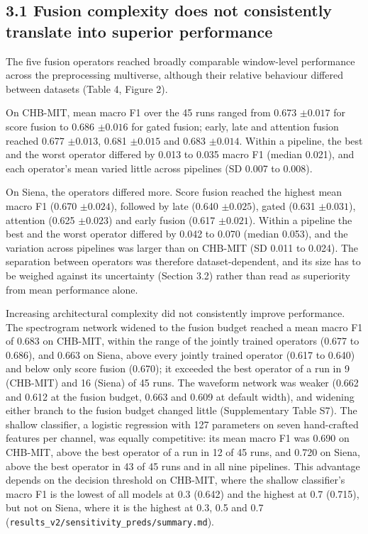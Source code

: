 \documentclass[11pt,a4paper]{article}
\begin{document}
\subsection{3.1 Fusion complexity does not consistently translate into superior performance}\label{fusion-complexity-does-not-consistently-translate-into-superior-performance}

The five fusion operators reached broadly comparable window-level performance across
the preprocessing multiverse, although their relative behaviour differed between
datasets (Table 4, Figure 2).

On CHB-MIT, mean macro F1 over the 45 runs ranged from 0.673 \(\pm 0.017\) for score fusion to
0.686 \(\pm 0.016\) for gated fusion; early, late and attention fusion reached 0.677 \(\pm 0.013\),
0.681 \(\pm 0.015\) and 0.683 \(\pm 0.014.\) Within a pipeline, the best and the worst operator
differed by 0.013 to 0.035 macro F1 (median 0.021), and each operator's mean varied
little across pipelines (SD 0.007 to 0.008).

On Siena, the operators differed more. Score fusion reached the highest mean macro F1
(0.670 \(\pm 0.024\)), followed by late (0.640 \(\pm 0.025\)), gated (0.631 \(\pm 0.031\)), attention
(0.625 \(\pm 0.023\)) and early fusion (0.617 \(\pm 0.021\)). Within a pipeline the best and the worst
operator differed by 0.042 to 0.070 (median 0.053), and the variation across pipelines
was larger than on CHB-MIT (SD 0.011 to 0.024). The separation between operators was
therefore dataset-dependent, and its size has to be weighed against its uncertainty
(Section 3.2) rather than read as superiority from mean performance alone.

Increasing architectural complexity did not consistently improve performance. The
spectrogram network widened to the fusion budget reached a mean macro F1 of 0.683 on
CHB-MIT, within the range of the jointly trained operators (0.677 to 0.686), and 0.663
on Siena, above every jointly trained operator (0.617 to 0.640) and below only score
fusion (0.670); it exceeded the best operator of a run in 9 (CHB-MIT) and 16 (Siena) of
45 runs. The waveform network was weaker (0.662 and 0.612 at the fusion budget, 0.663 and
0.609 at default width), and widening either branch to the fusion budget changed little
(Supplementary Table S7). The shallow classifier, a logistic regression with 127
parameters on seven hand-crafted features per channel, was equally competitive: its
mean macro F1 was 0.690 on CHB-MIT, above the best operator of a run in 12 of 45 runs,
and 0.720 on Siena, above the best operator in 43 of 45 runs and in all nine pipelines.
This advantage depends on the decision threshold on CHB-MIT, where the shallow
classifier's macro F1 is the lowest of all models at 0.3 (0.642) and the highest at 0.7
(0.715), but not on Siena, where it is the highest at 0.3, 0.5 and 0.7
(\nolinkurl{results_v2/sensitivity_preds/summary.md}).
\end{document}
